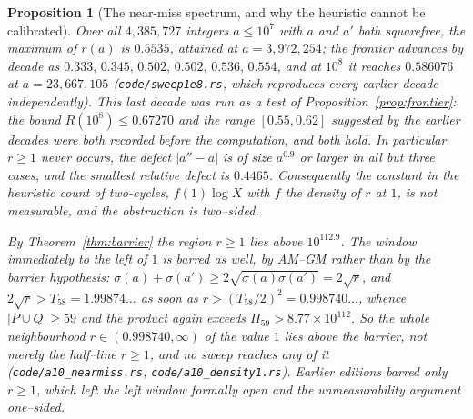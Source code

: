 \documentclass[11pt]{article}
\newtheorem{proposition}[theorem]{Proposition}
\theoremstyle{definition}
\begin{document}
\begin{proposition}[The near-miss spectrum, and why the heuristic cannot be calibrated]\label{prop:nearmiss}
Over all $4{,}385{,}727$ integers $a\le10^7$ with $a$ and $a'$ both squarefree, the maximum of
$r(a)$ is $0.5535$, attained at $a=3{,}972{,}254$; the frontier advances by decade as
$0.333,\,0.345,\,0.502,\,0.502,\,0.536,\,0.554$, and at $10^{8}$ it reaches $0.586076$ at
$a=23{,}667{,}105$ \textup{(\texttt{code/sweep1e8.rs}, which reproduces every earlier decade
independently)}. This last decade was run as a test of Proposition~\ref{prop:frontier}: the bound
$R(10^{8})\le0.67270$ and the range $[0.55,0.62]$ suggested by the earlier decades were both
recorded before the computation, and both hold. In particular $r\ge1$ never occurs, the defect
$|a''-a|$ is of size $a^{0.9}$ or larger in all but three cases, and the smallest relative defect is
$0.4465$. Consequently the constant in the heuristic count of two-cycles, $f(1)\log X$ with $f$ the
density of $r$ at $1$, is \emph{not measurable}, and the obstruction is two--sided.

By Theorem~\textup{\ref{thm:barrier}} the region $r\ge1$ lies above $10^{112.9}$. The window
immediately to the \emph{left} of $1$ is barred as well, by AM--GM rather than by the barrier
hypothesis: $\sigma(a)+\sigma(a')\ge2\sqrt{\sigma(a)\sigma(a')}=2\sqrt r$, and
$2\sqrt r>T_{58}=1.99874\ldots$ as soon as $r>(T_{58}/2)^2=0.998740\ldots$, whence $|P\cup Q|\ge59$
and the product again exceeds $\Pi_{59}>8.77\times10^{112}$. So the whole neighbourhood
$r\in(0.998740,\infty)$ of the value $1$ lies above the barrier, not merely the half--line $r\ge1$,
and no sweep reaches any of it \textup{(\texttt{code/a10\_nearmiss.rs},
\texttt{code/a10\_density1.rs})}. Earlier editions barred only $r\ge1$, which left the left window
formally open and the unmeasurability argument one--sided.
\end{proposition}
\end{document}

